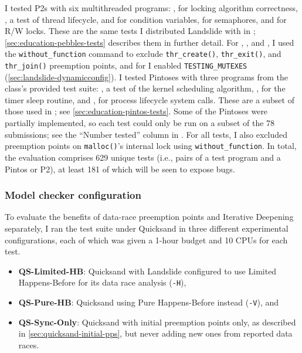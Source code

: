 I tested P2s with six multithreaded programs:
\mxtest, for locking algorithm correctness,
\tej, a test of thread lifecycle,
\bct and \paraguay for condition variables,
\paradise for semaphores,
and \rwldgr for R/W locks.
These are the same tests I distributed Landslide with in ;
\cref{sec:education-pebbles-tests} describes them in further detail.
For \mxtest, \paradise, and \paraguay,
I used the {\tt without\_function} command to exclude
{\tt thr\_create()}, {\tt thr\_exit()}, and {\tt thr\_join()} preemption points,
and for \mxtest I enabled {\tt TESTING\_MUTEXES} (\cref{sec:landslide-dynamicconfig}).
I tested Pintoses with three programs from the class's provided test suite:
\prisema, a test of the kernel scheduling algorithm,
\alarmsimul, for the timer sleep routine,
and \waitsimple, for process lifecycle system calls.
These are a subset of those used in ; see \cref{sec:education-pintos-tests}.
Some of the Pintoses were partially implemented,
so each test could only be run on a subset of the 78 submissions;
see the ``Number tested'' column in .
For all tests,
I also excluded preemption points on {\tt malloc()}'s internal lock using {\tt without\_function}.
In total, the evaluation comprises 629 unique tests (i.e., pairs of a test program and a Pintos or P2),
at least 181 of which will be seen to expose bugs.

\subsubsection{Model checker configuration}
\label{sec:quicksand-expt-trials}

To evaluate the benefits of data-race preemption points and Iterative Deepening separately,
I ran the test suite under Quicksand in three different experimental configurations,
each of which was given a 1-hour budget and 10 CPUs for each test.

\begin{itemize}
	\item {\bf QS-Limited-HB}: Quicksand with Landslide configured to use Limited Happens-Before for its data race analysis ({\tt -H}),
	\item {\bf QS-Pure-HB}: Quicksand using Pure Happens-Before instead ({\tt -V}), and
	\item {\bf QS-Sync-Only}: Quicksand with initial preemption points only,
		as described in \cref{sec:quicksand-initial-pps},
		but never adding new ones from reported data races.
\end{itemize}

